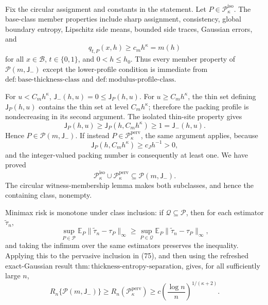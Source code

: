 Fix the circular assignment and constants in the statement. Let \(P\in\mathcal P_{\kappa}^{\mathrm{iso}}\). The base-class member properties include sharp assignment, consistency, global boundary entropy, Lipschitz side means, bounded side traces, Gaussian errors, and
\[
 q_{t,P}(x,h)\ge c_mh^\kappa=m(h)
\]
for all \(x\in\mathcal B\), \(t\in\{0,1\}\), and \(0<h\le h_0\). Thus every member property of \(\mathcal P(m,\mathsf J_{-})\) except the lower-profile condition is immediate from \(\mathrm{def:base\text{-}thickness\text{-}class}\) and \(\mathrm{def:modulus\text{-}profile\text{-}class}\).

For \(u<C_mh^\kappa\), \(\mathsf J_{-}(h,u)=0\le\mathsf J_P(h,u)\). For \(u\ge C_mh^\kappa\), the thin set defining \(\mathsf J_P(h,u)\) contains the thin set at level \(C_mh^\kappa\); therefore the packing profile is nondecreasing in its second argument. The isolated thin-site property gives
\[
 \mathsf J_P(h,u)\ge\mathsf J_P(h,C_mh^\kappa)\ge1
 =\mathsf J_{-}(h,u). \tag{74}
\]
Hence \(P\in\mathcal P(m,\mathsf J_{-})\). If instead \(P\in\mathcal P_{\kappa}^{\mathrm{perv}}\), the same argument applies, because
\[
 \mathsf J_P(h,C_mh^\kappa)\ge c_Jh^{-1}>0,
\]
and the integer-valued packing number is consequently at least one. We have proved
\[
 \mathcal P_{\kappa}^{\mathrm{iso}}\cup
 \mathcal P_{\kappa}^{\mathrm{perv}}
 \subseteq\mathcal P(m,\mathsf J_{-}). \tag{75}
\]
The circular witness-membership lemma makes both subclasses, and hence the containing class, nonempty.

Minimax risk is monotone under class inclusion: if \(\mathcal Q\subseteq\mathcal P\), then for each estimator \(\widetilde\tau_n\),
\[
 \sup_{P\in\mathcal P}\mathbb E_P\|\widetilde\tau_n-\tau_P\|_\infty
 \ge
 \sup_{P\in\mathcal Q}\mathbb E_P\|\widetilde\tau_n-\tau_P\|_\infty,
\]
and taking the infimum over the same estimators preserves the inequality. Applying this to the pervasive inclusion in (75), and then using the refreshed exact-Gaussian result \(\mathrm{thm:thickness\text{-}entropy\text{-}separation}\), gives, for all sufficiently large \(n\),
\[
 R_n\{\mathcal P(m,\mathsf J_{-})\}
 \ge R_n(\mathcal P_{\kappa}^{\mathrm{perv}})
 \ge c\left(\frac{\log n}{n}\right)^{1/(\kappa+2)}. \tag{76}
\]

